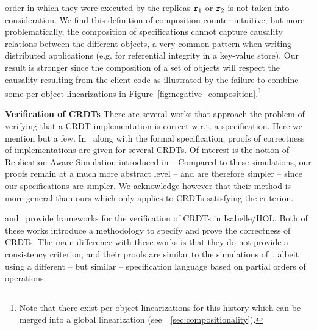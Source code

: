 \begin{inparaenum}
  order in which they were executed by the replicas $\mathtt{r}_1$ or $\mathtt{r}_2$
  is not taken into consideration.
  We find this definition of composition counter-intuitive, but more
  problematically, the composition of specifications cannot capture
  causality relations between the different objects, a very common
  pattern when writing distributed applications (e.g. for referential
  integrity in a key-value store).
  Our result is stronger since the composition of a set of
  objects will respect the causality resulting from the client code as
  illustrated by the failure to combine some per-object linearizations
  in Figure~\ref{fig:negative_composition}.\footnote{Note that there
    exist per-object linearizations for this history which can be merged into a global linearization (see~\sectionautorefname~\ref{sec:compositionality}).}
\end{inparaenum}

\smallskip
\noindent
{\bf Verification of CRDTs}
There are several works that approach the problem of verifying that a
CRDT implementation is correct w.r.t. a specification.
%
Here we mention but a few.
%
In~\cite{BurckhardtGYZ14, AttiyaBGMYZ16, Burckhardt14} along with the
formal specification, proofs of correctness of implementations are
given for several CRDTs.
%
Of interest is the notion of Replication Aware Simulation introduced
in~\cite{BurckhardtGYZ14}.
%
Compared to these simulations, our proofs remain at a much more
abstract level -- and are therefore simpler -- since our
specifications are simpler.
%
We acknowledge however that their method is more general than ours
which only applies to CRDTs satisfying the \CRDTLinshort{} criterion.

\citet{ZellerBP14} and~\citet{GomesKMB17} provide frameworks for the
verification of CRDTs in Isabelle/HOL\@.
%
Both of these works introduce a methodology to specify and prove the
correctness of CRDTs.
%
The main difference with these works is that they do not provide a
consistency criterion, and their proofs are similar to the simulations
of~\cite{BurckhardtGYZ14}, albeit using a different -- but similar
-- specification language based on partial orders of operations.

